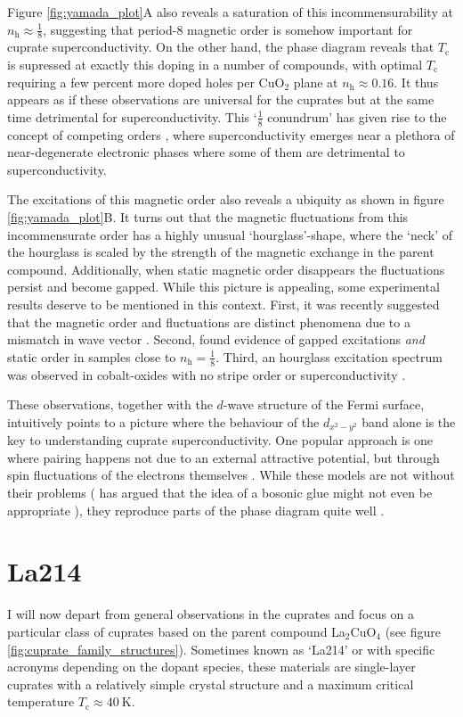 Figure \ref{fig:yamada_plot}A also reveals a saturation of this incommensurability at $n_\text{h} \approx \frac{1}{8}$, suggesting that period-8 magnetic order is somehow important for cuprate superconductivity. On the other hand, the phase diagram reveals that $T_\text{c}$ is supressed at exactly this doping in a number of compounds, with optimal $T_\text{c}$ requiring a few percent more doped holes per CuO$_2$ plane at $n_\text{h} \approx 0.16$. It thus appears as if these observations are universal for the cuprates but at the same time detrimental for superconductivity. This `$\frac{1}{8}$ conundrum' has given rise to the concept of competing orders \cite{Demler2001, Zhang2002, Chang2008, Birgeneau2006}, where superconductivity emerges near a plethora of near-degenerate electronic phases where some of them are detrimental to superconductivity.

The excitations of this magnetic order also reveals a ubiquity as shown in figure \ref{fig:yamada_plot}B. It turns out that the magnetic fluctuations from this incommensurate order has a highly unusual `hourglass'-shape, where the `neck' of the hourglass is scaled by the strength of the magnetic exchange in the parent compound. Additionally, when static magnetic order disappears the fluctuations persist and become gapped. While this picture is appealing, some experimental results deserve to be mentioned in this context. First, it was recently suggested that the magnetic order and fluctuations are distinct phenomena due to a mismatch in wave vector \cite{Jacobsen2018}. Second, \citeauthor{Kofu2009} found evidence of gapped excitations \emph{and} static order in samples close to $n_\text{h} = \frac{1}{8}$. Third, an hourglass excitation spectrum was observed in cobalt-oxides with no stripe order or superconductivity \cite{Drees2013,Drees2014}.

These observations, together with the $d$-wave structure of the Fermi surface, intuitively points to a picture where the behaviour of the $d_{x^2-y^2}$ band alone is the key to understanding cuprate superconductivity. One popular approach is one where pairing happens not due to an external attractive potential, but through spin fluctuations of the electrons themselves \cite{Scalapino2012}. While these models are not without their problems (\citeauthor{Anderson2007} has argued that the idea of a bosonic glue might not even be appropriate \cite{Anderson2007}), they reproduce parts of the phase diagram quite well \cite{Bickers1989}.

\section{La214}\label{sec:lsco}
I will now depart from general observations in the cuprates and focus on a particular class of cuprates based on the parent compound La$_2$CuO$_4$ (see figure \ref{fig:cuprate_family_structures}). Sometimes known as `La214' or with specific acronyms depending on the dopant species, these materials are single-layer cuprates with a relatively simple crystal structure and a maximum critical temperature $T_\text{c} \approx \SI{40}{\kelvin}$. 

